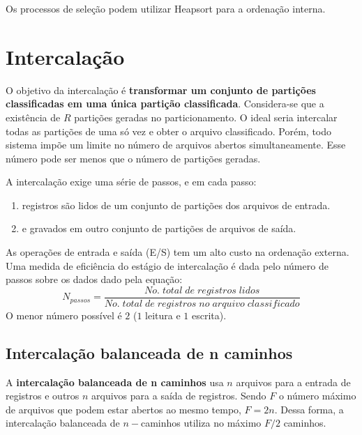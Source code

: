 Os processos de seleção podem utilizar Heapsort para a ordenação interna.

\section{Intercalação}

O objetivo da intercalação é {\bf transformar um conjunto de partições classificadas em uma 
única partição classificada}.
Considera-se que a existência de $R$ partições geradas no particionamento.
O ideal seria intercalar todas as partições de uma só vez e obter o arquivo classificado.
Porém, todo sistema impõe um limite no número de arquivos abertos simultaneamente. 
Esse número pode ser menos que o número de partições geradas.

A intercalação exige uma série de passos, e em cada passo:
\begin{enumerate}
\item registros são lidos de um conjunto de partições dos arquivos de entrada.
\item e gravados em outro conjunto de partições de arquivos de saída.
\end{enumerate}

As operações de entrada e saída (E/S) tem um alto custo na ordenação externa.
Uma medida de eficiência do estágio de intercalação é dada pelo número de passos 
sobre os dados dado pela equação:
\begin{equation*}
N_{passos} = \frac{No. \; total \; de \; registros \; lidos}{No. \; total \;  de \; registros \; no \; arquivo \; classificado}
\end{equation*}
O menor número possível é $2$ ($1$ leitura e $1$ escrita).

\subsection{Intercalação balanceada de n caminhos}

A {\bf intercalação balanceada de n caminhos} usa $n$ arquivos para a entrada
de registros e outros $n$ arquivos para a saída de registros.  Sendo $F$ o
número máximo de arquivos que podem estar abertos ao mesmo tempo, $F = 2 n$.
Dessa forma, a intercalação balanceada de $n-$caminhos utiliza no máximo $F/2$
caminhos.

